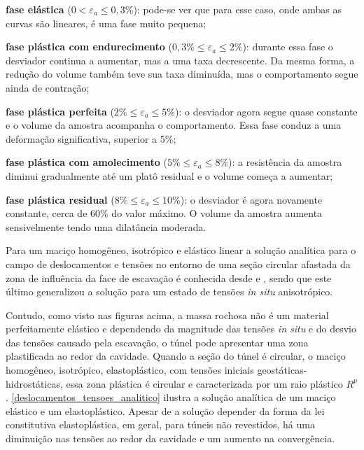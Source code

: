 \begin{alineas}
	
	\item \textbf{fase elástica} ($0 < \varepsilon_a \le 0,3\%$): pode-se ver que para esse caso, onde ambas as curvas são lineares, é uma fase muito pequena;
	
	\item \textbf{fase plástica com endurecimento} ($0,3\%\le \varepsilon_a \le 2\%$): durante essa fase o desviador continua a aumentar, mas a uma taxa decrescente. Da mesma forma, a redução do volume também teve sua taxa diminuída, mas o comportamento segue ainda de contração;
	
	\item \textbf{fase plástica perfeita} ($2\%\le \varepsilon_a \le 5\%$): o desviador agora segue quase constante e o volume da amostra acompanha o comportamento. Essa fase conduz a uma deformação significativa, superior a 5\%;
	
	\item \textbf{fase plástica com amolecimento} ($5\%\le \varepsilon_a \le 8\%$): a resistência da amostra diminui gradualmente até um platô residual e o volume começa a aumentar;
	
	\item \textbf{fase plástica residual} ($8\%\le \varepsilon_a \le 10\%$): o desviador é agora novamente constante, cerca de 60\% do valor máximo. O volume da amostra aumenta sensivelmente tendo uma dilatância moderada.
	
\end{alineas}

Para um maciço homogêneo, isotrópico e elástico linear a solução analítica para o campo de deslocamentos e tensões no entorno de uma seção circular afastada da zona de influência da face de escavação é conhecida desde  e , sendo que este último generalizou a solução para um estado de tensões \textit{in situ} anisotrópico. 

Contudo, como visto nas figuras acima, a massa rochosa não é um material perfeitamente elástico e dependendo da magnitude das tensões \textit{in situ} e do desvio das tensões causado pela escavação, o túnel pode apresentar uma zona plastificada ao redor da cavidade. Quando a seção do túnel é circular, o maciço homogêneo, isotrópico, elastoplástico, com tensões iniciais geostáticas-hidrostáticas, essa zona plástica é circular e caracterizada por um raio plástico $R^p$. \autoref{deslocamentos_tensoes_analitico} ilustra a solução analítica de um maciço elástico e um elastoplástico. Apesar de a solução depender da forma da lei constitutiva elastoplástica, em geral, para túneis não revestidos, há uma diminuição nas tensões ao redor da cavidade e um aumento na convergência.

